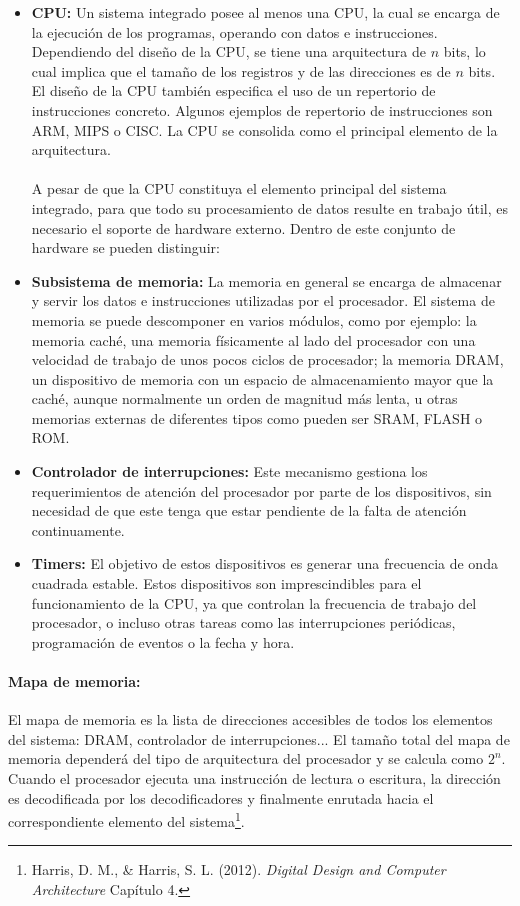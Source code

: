 \begin{itemize}
\item \textbf{CPU:} Un sistema integrado posee al menos una CPU, la cual se encarga de la ejecuci\'on de los programas, operando con datos e instrucciones. Dependiendo del diseño de la CPU, se tiene una arquitectura de $n$ bits, lo cual implica que el tamaño de los registros y de las direcciones es de $n$ bits. El diseño de la CPU también especifica el uso de un repertorio de instrucciones concreto. Algunos ejemplos de repertorio de instrucciones son ARM, MIPS o CISC. La CPU se consolida como el principal elemento de la arquitectura.
\paragraph{}
   A pesar de que la CPU constituya el elemento principal del sistema integrado, para que todo su procesamiento de datos resulte en trabajo \'util, es necesario el soporte de hardware externo. Dentro de este conjunto de hardware se pueden distinguir:
\item \textbf{Subsistema de memoria:} La memoria en general se encarga de almacenar y servir los datos e instrucciones utilizadas por el procesador. El sistema de memoria se puede descomponer en varios m\'odulos, como por ejemplo: la memoria cach\'e, una memoria f\'isicamente al lado del procesador con una velocidad de trabajo de unos pocos ciclos de procesador; la memoria DRAM, un dispositivo de memoria con un espacio de almacenamiento mayor que la cach\'e, aunque normalmente un orden de magnitud m\'as lenta, u otras memorias externas de diferentes tipos como pueden ser SRAM, FLASH o ROM.
\item \textbf{Controlador de interrupciones:} Este mecanismo gestiona los requerimientos de atención del procesador por parte de los dispositivos, sin necesidad de que este tenga que estar pendiente de la falta de atención continuamente.
\item \textbf{Timers:} El objetivo de estos dispositivos es generar una frecuencia de onda cuadrada estable. Estos dispositivos son imprescindibles para el funcionamiento de la CPU, ya que controlan la frecuencia de trabajo del procesador, o incluso otras tareas como las interrupciones periódicas, programación de eventos o la fecha y hora.
\end{itemize}
\paragraph{Mapa de memoria:} El mapa de memoria es la lista de direcciones accesibles de todos los elementos del sistema: DRAM, controlador de interrupciones... El tamaño total del mapa de memoria dependerá del tipo de arquitectura del procesador y se calcula como $2^n$. Cuando el procesador ejecuta una instrucción de lectura o escritura, la dirección es decodificada por los decodificadores y finalmente enrutada hacia el correspondiente elemento del sistema\footnote{Harris, D. M., \& Harris, S. L. (2012). \textit{Digital Design and Computer Architecture} Capítulo 4.}.

